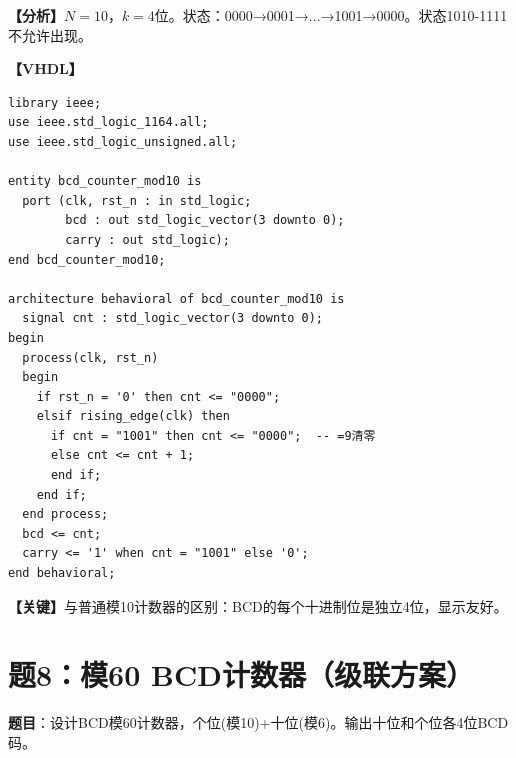 \begin{solution}[完整解答]

\textbf{【分析】}$N=10$，$k=4$位。状态：0000→0001→...→1001→0000。状态1010-1111不允许出现。

\textbf{【VHDL】}
\begin{lstlisting}
library ieee;
use ieee.std_logic_1164.all;
use ieee.std_logic_unsigned.all;

entity bcd_counter_mod10 is
  port (clk, rst_n : in std_logic;
        bcd : out std_logic_vector(3 downto 0);
        carry : out std_logic);
end bcd_counter_mod10;

architecture behavioral of bcd_counter_mod10 is
  signal cnt : std_logic_vector(3 downto 0);
begin
  process(clk, rst_n)
  begin
    if rst_n = '0' then cnt <= "0000";
    elsif rising_edge(clk) then
      if cnt = "1001" then cnt <= "0000";  -- =9清零
      else cnt <= cnt + 1;
      end if;
    end if;
  end process;
  bcd <= cnt;
  carry <= '1' when cnt = "1001" else '0';
end behavioral;
\end{lstlisting}

\textbf{【关键】}与普通模10计数器的区别：BCD的每个十进制位是独立4位，显示友好。

\end{solution}


\section{题8：模60 BCD计数器（级联方案）}

\textbf{题目}：设计BCD模60计数器，个位(模10)+十位(模6)。输出十位和个位各4位BCD码。

